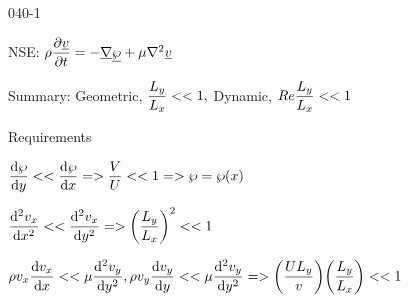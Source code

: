 \begin{mitframe}{040-1}

        
\begin{listone}

\item NSE: $\dens\dfrac{\partial\uline{\vvel}}{\partial{t}}=-\gradop\uline{\dynpress}+\chempot\nabla^2\uline{\vvel}$

			\begin{listtwo}
            
            \item Summary: Geometric, $\dfrac{\length_y}{\length_{\disp}}<<1, $ Dynamic, $\reynolds\dfrac{\length_y}{\length_{\disp}}<< 1$
            
            \item Requirements
            
            				\begin{listthree}
                            
                            \item $\dfrac{\mathrm{d}\dynpress}{\mathrm{d}y}<<\dfrac{\mathrm{d}\dynpress}{\mathrm{d}\disp}=>\dfrac{\vol}{\uvel}<<1=>\dynpress=\dynpress(\disp)$
                            
                            \item $\dfrac{\mathrm{d}^2\vvel_{\disp}}{\mathrm{d}\disp^2}<<\dfrac{\mathrm{d}^2\vvel_{\disp}}{\mathrm{d}y^2}=>\bigg(\dfrac{\length_y}{\length_{\disp}}\bigg)^2<<1$
                            
                            \item$\dens\vvel_{\disp}\dfrac{\mathrm{d}\vvel_{\disp}}{\mathrm{d}\disp}<<\chempot\dfrac{\mathrm{d}^2\vvel_{y}}{\mathrm{d}y^2},\dens\vvel_{y}\dfrac{\mathrm{d}\vvel_{y}}{\mathrm{d}y}<<\chempot\dfrac{\mathrm{d}^2\vvel_{y}}{\mathrm{d}y^2}=>\bigg(\dfrac{\uvel\length_{y}}{\vvel}\bigg)\bigg(\dfrac{\length_{y}}{\length_{\disp}}\bigg)<<1$
                                                                        
\end{listthree}

\end{listtwo}

\end{listone}     
\end{mitframe}